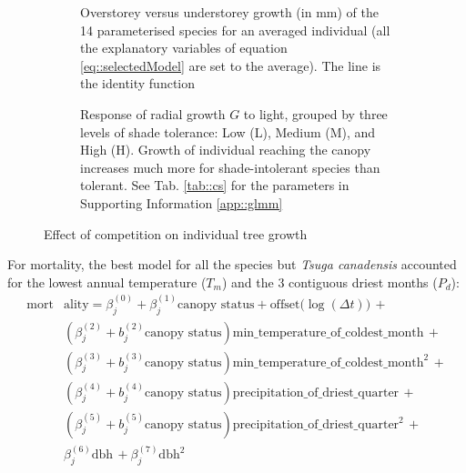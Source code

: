 \begin{figure}
\begin{subfigure}[t]{.48\textwidth}
	\centering
	
	\caption{Overstorey versus understorey growth (in mm) of the 14 parameterised species for an averaged individual (\ie all the explanatory variables of equation \eqref{eq::selectedModel} are set to the average). The line is the identity function}
	\label{fig::over_under}
\end{subfigure}
\hfill
\begin{subfigure}[t]{.48\textwidth}
	\centering
	
	\caption{Response of radial growth $ G $ to light, grouped by three levels of shade tolerance: Low (L), Medium (M), and High (H). Growth of individual reaching the canopy increases much more for shade-intolerant species than tolerant. See Tab. \ref{tab::cs} for the parameters in Supporting Information \ref{app::glmm}}
	\label{fig::groups}
\end{subfigure}
\caption{Effect of competition on individual tree growth}
\label{fig::growthResults}
\end{figure}

For mortality, the best model for all the species but \textit{Tsuga
canadensis} accounted for the lowest annual temperature ($ T_m $) and the 3
contiguous driest months ($ P_d $):
\begin{equation} \label{eq::selectedModel_mu}
	\begin{split}
		\text{mort} & \text{ality} = \beta_j^{(0)} + \beta_j^{(1)} \text{canopy status} +
			\text{offset}\big(\log(\Delta t) \big) \, + \\
		& \left(\beta_j^{(2)} + b_j^{(2)} \text{canopy status} \right) \text{min}\_\text{temperature}\_\text{of}\_\text{coldest}\_\text{month} \, + \\
		& \left(\beta_j^{(3)} + b_j^{(3)} \text{canopy status} \right) \text{min}\_\text{temperature}\_\text{of}\_\text{coldest}\_\text{month}^2 \, + \\
		& \left(\beta_j^{(4)} + b_j^{(4)} \text{canopy status} \right) \text{precipitation}\_\text{of}\_\text{driest}\_\text{quarter} \, + \\
		& \left(\beta_j^{(5)} + b_j^{(5)} \text{canopy status} \right) \text{precipitation}\_\text{of}\_\text{driest}\_\text{quarter}^2 \, + \\
		& \beta_j^{(6)} \text{dbh} \, + \beta_j^{(7)} \text{dbh}^2
	\end{split}
\end{equation}

